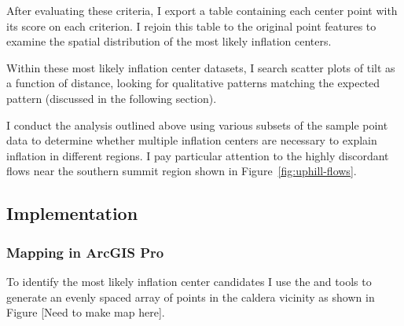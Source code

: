 After evaluating these criteria, I export a table containing each center point with its score on each criterion. I rejoin this table to the original point features to examine the spatial distribution of the most likely inflation centers.

Within these most likely inflation center datasets, I search scatter plots of tilt as a function of distance, looking for qualitative patterns matching the expected pattern (discussed in the following section).

I conduct the analysis outlined above using various subsets of the sample point data to determine whether multiple inflation centers are necessary to explain inflation in different regions. I pay particular attention to the highly discordant flows near the southern summit region shown in Figure~\ref{fig:uphill-flows}.


\subsection{Implementation}


\subsubsection{Mapping in ArcGIS Pro}

To identify the most likely inflation center candidates I use the  and  tools to generate an evenly spaced array of points in the caldera vicinity as shown in Figure [Need to make map here].

